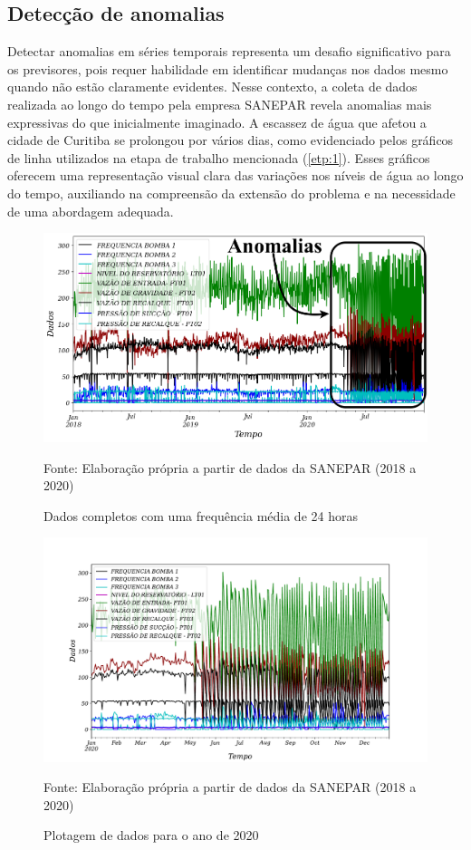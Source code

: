  

\subsection{Detec\c cão de anomalias} \label{subsec:detec}


Detectar anomalias em séries temporais representa um desafio significativo para os previsores, pois requer habilidade em identificar mudanças nos dados mesmo quando não estão claramente evidentes. Nesse contexto, a coleta de dados realizada ao longo do tempo pela empresa SANEPAR revela anomalias mais expressivas do que inicialmente imaginado. A escassez de água que afetou a cidade de Curitiba se prolongou por vários dias, como evidenciado pelos gráficos de linha utilizados na etapa de trabalho mencionada (\ref{etp:1}). Esses gráficos oferecem uma representação visual clara das variações nos níveis de água ao longo do tempo, auxiliando na compreensão da extensão do problema e na necessidade de uma abordagem adequada.

\begin{figure}[H]
	\centering
	\caption{Dados completos com uma frequência média de 24 horas}
	\label{fig:dados-todos}
	\includegraphics[width=0.9\linewidth]{"Introducao/Figuras/dados todos"}
	
	Fonte: Elaboração própria a partir de dados da SANEPAR (2018 a 2020)
\end{figure}

\begin{figure}[H]
	\centering
	\caption{Plotagem de dados para o ano de 2020}
	\label{fig:2020-a-frente}
	\includegraphics[width=0.9\linewidth]{"Introducao/Figuras/2020 a frente"}
	
	Fonte: Elaboração própria a partir de dados da SANEPAR (2018 a 2020)
\end{figure}


